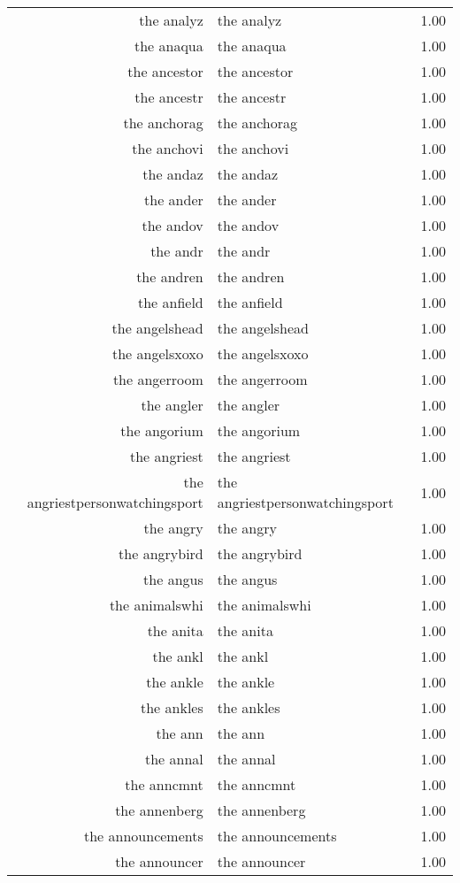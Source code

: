 \begin{table}[ht]
\begin{tabular}{rlr}
  the analyz & the analyz & 1.00 \\ 
  the anaqua & the anaqua & 1.00 \\ 
  the ancestor & the ancestor & 1.00 \\ 
  the ancestr & the ancestr & 1.00 \\ 
  the anchorag & the anchorag & 1.00 \\ 
  the anchovi & the anchovi & 1.00 \\ 
  the andaz & the andaz & 1.00 \\ 
  the ander & the ander & 1.00 \\ 
  the andov & the andov & 1.00 \\ 
  the andr & the andr & 1.00 \\ 
  the andren & the andren & 1.00 \\ 
  the anfield & the anfield & 1.00 \\ 
  the angelshead & the angelshead & 1.00 \\ 
  the angelsxoxo & the angelsxoxo & 1.00 \\ 
  the angerroom & the angerroom & 1.00 \\ 
  the angler & the angler & 1.00 \\ 
  the angorium & the angorium & 1.00 \\ 
  the angriest & the angriest & 1.00 \\ 
  the angriestpersonwatchingsport & the angriestpersonwatchingsport & 1.00 \\ 
  the angry & the angry & 1.00 \\ 
  the angrybird & the angrybird & 1.00 \\ 
  the angus & the angus & 1.00 \\ 
  the animalswhi & the animalswhi & 1.00 \\ 
  the anita & the anita & 1.00 \\ 
  the ankl & the ankl & 1.00 \\ 
  the ankle & the ankle & 1.00 \\ 
  the ankles & the ankles & 1.00 \\ 
  the ann & the ann & 1.00 \\ 
  the annal & the annal & 1.00 \\ 
  the anncmnt & the anncmnt & 1.00 \\ 
  the annenberg & the annenberg & 1.00 \\ 
  the announcements & the announcements & 1.00 \\ 
  the announcer & the announcer & 1.00 \\ 

\end{tabular}
\end{table}
